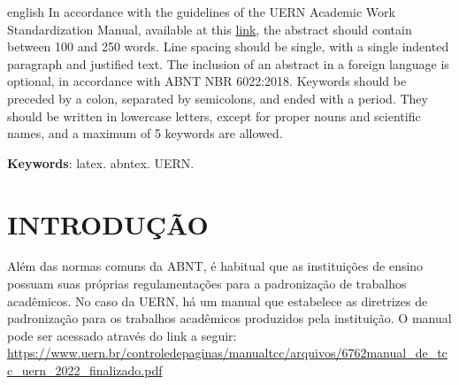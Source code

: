 \documentclass[
article,			%
12pt,				%
oneside,			%
a4paper,			%
english,			%
brazil,				%
sumario=tradicional
]{abntex2}
\begin{document}
	\renewcommand{\resumoname}{Abstract}
	\begin{resumoumacoluna}
		\begin{otherlanguage*}{english}
			In accordance with the guidelines of the UERN Academic Work Standardization Manual, available at this \href{https://www.uern.br/controledepaginas/manualtcc/arquivos/6762manual_de_tcc_uern_2022_finalizado.pdf}{link}, the abstract should contain between 100 and 250 words. Line spacing should be single, with a single indented paragraph and justified text. The inclusion of an abstract in a foreign language is optional, in accordance with ABNT NBR 6022:2018. Keywords should be preceded by a colon, separated by semicolons, and ended with a period. They should be written in lowercase letters, except for proper nouns and scientific names, and a maximum of 5 keywords are allowed.
			
			\vspace{\onelineskip}
			
			\noindent
			\textbf{Keywords}: latex. abntex. UERN.
		\end{otherlanguage*}  
	\end{resumoumacoluna}
	
		
	
	\textual
	\section{INTRODUÇÃO}
	
	Além das normas comuns da ABNT, é habitual que as instituições de ensino possuam suas próprias regulamentações para a padronização de trabalhos acadêmicos. No caso da UERN, há um manual que estabelece as diretrizes de padronização para os trabalhos acadêmicos produzidos pela instituição. O manual pode ser acessado através do link a seguir: \url{https://www.uern.br/controledepaginas/manualtcc/arquivos/6762manual_de_tcc_uern_2022_finalizado.pdf}
	
\end{document}
